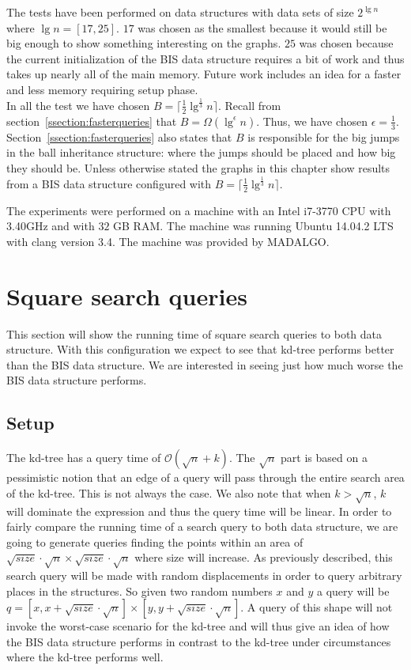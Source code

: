 The tests have been performed on data structures with data sets of size $2^{\lg n}$ where $\lg n = [17,25]$. $17$ was chosen as the smallest because it would still be big enough to show something interesting on the graphs. $25$ was chosen because the current initialization of the BIS data structure requires a bit of work and thus takes up nearly all of the main memory. Future work includes an idea for a faster and less memory requiring setup phase.\\

In all the test we have chosen $B = \lceil \frac{1}{2}\lg^{\frac{1}{3}} n \rceil$. Recall from section~\ref{ssection:fasterqueries} that $B = \Omega(\lg^\epsilon n)$. Thus, we have chosen $\epsilon = \frac{1}{3}$. Section~\ref{ssection:fasterqueries} also states that $B$ is responsible for the big jumps in the ball inheritance structure: where the jumps should be placed and how big they should be. Unless otherwise stated the graphs in this chapter show results from a BIS data structure configured with $B = \lceil \frac{1}{2}\lg^{\frac{1}{3}} n \rceil$.


The experiments were performed on a machine with an Intel i7-3770 CPU with 3.40GHz and with $32$ GB RAM. The machine was running Ubuntu 14.04.2 LTS with clang version 3.4. The machine was provided by MADALGO.



\section{Square search queries}
\label{sect:squares}

This section will show the running time of square search queries to both data structure. With this configuration we expect to see that kd-tree performs better than the BIS data structure. We are interested in seeing just how much worse the BIS data structure performs. 

\subsection{Setup}
The kd-tree has a query time of $\mathcal{O}(\sqrt{n}+k)$. The $\sqrt{n}$ part is based on a pessimistic notion that an edge of a query will pass through the entire search area of the kd-tree. This is not always the case. We also note that when $k > \sqrt{n}$, $k$ will dominate the expression and thus the query time will be linear. In order to fairly compare the running time of a search query to both data structure, we are going to generate queries finding the points within an area of $\sqrt{size}\cdot\sqrt{n} \times \sqrt{size}\cdot\sqrt{n}$ where size will increase. As previously described, this search query will be made with random displacements in order to query arbitrary places in the structures. So given two random numbers $x$ and $y$ a query will be $q = [x, x+\sqrt{size}\cdot\sqrt{n}] \times [y, y+\sqrt{size}\cdot\sqrt{n}]$. A query of this shape will not invoke the worst-case scenario for the kd-tree and will thus give an idea of how the BIS data structure performs in contrast to the kd-tree under circumstances where the kd-tree performs well. \\

